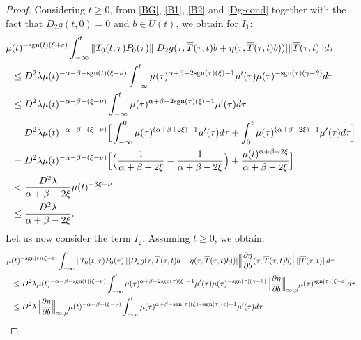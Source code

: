 \documentclass[9pt]{amsart}
\numberwithin{equation}{section}
\numberwithin{lemma}{section}
\begin{document}
\begin{proof}
Considering $t\geq 0$, from \eqref{BG}, \eqref{B1}, \eqref{B2} and \eqref{Dg-cond} together
with the fact that $D_2g(t,0)=0$ and $b\in U(t)$, we obtain for $I_1:$
\begin{equation*}
    \begin{split}
        \mu&(t)^{-\textnormal{sgn}(t)(\xi+\varepsilon)}\int_{-\infty}^{t}\|T_0(t,\tau)P_0(\tau)\| |D_2g(\tau, \overline{T}(\tau,t)b+\eta(\tau,\overline{T}(\tau,t)b))| \|\overline{T}(\tau,t)\|d\tau\\
        &\leq D^2\lambda\mu(t)^{-\alpha-\beta-\textnormal{sgn}(t)(\xi-\nu)}\int_{-\infty}^{t}\mu(\tau)^{\alpha+\beta-2\textnormal{sgn}(\tau)(\xi)-1}\mu'(\tau)\mu(\tau)^{-\textnormal{sgn}(\tau)(\gamma-\theta)}d\tau\\
        &\leq D^2\lambda\mu(t)^{-\alpha-\beta-(\xi-\nu)}\int_{-\infty}^{t}\mu(\tau)^{\alpha+\beta-2\textnormal{sgn}(\tau)(\xi)-1}\mu'(\tau)d\tau\\
        &= D^2\lambda\mu(t)^{-\alpha-\beta-(\xi-\nu)}\Big[\int_{-\infty}^{0}\mu(\tau)^{(\alpha+\beta+2\xi)-1}\mu'(\tau)d\tau+\int_{0}^{t}\mu(\tau)^{(\alpha+\beta-2\xi)-1}\mu'(\tau)d\tau\Big]\\
        &= D^2\lambda\mu(t)^{-\alpha-\beta-(\xi-\nu)}\Big[\Big(\frac{1}{\alpha+\beta+2\xi}-\frac{1}{\alpha+\beta-2\xi}\Big)+\frac{\mu(t)^{\alpha+\beta-2\xi}}{\alpha+\beta-2\xi}\Big]\\
        &< \frac{D^2\lambda}{\alpha+\beta-2\xi}\mu(t)^{-3\xi+\nu}\\
        &\leq \frac{D^2\lambda}{\alpha+\beta-2\xi}.
    \end{split}
    \end{equation*}
    Let us now consider the term \(I_2\). Assuming \(t \geq 0\), we obtain:
\begin{equation*}
    \begin{split}
        \mu&(t)^{-\textnormal{sgn}(t)(\xi+\varepsilon)}\int_{-\infty}^{t}\|T_0(t,\tau)P_0(\tau)\| |D_2g(\tau, \overline{T}(\tau,t)b+\eta(\tau,\overline{T}(\tau,t)b))| \Big\|\frac{\partial\eta}{\partial b}(\tau,\overline{T}(\tau,t)b)\Big\|\|\overline{T}(\tau,t)\|d\tau\\
        &\leq D^2\lambda\mu(t)^{-\alpha-\beta-\textnormal{sgn}(t)(\xi-\nu)}\int_{-\infty}^{t}\mu(\tau)^{\alpha+\beta-2\textnormal{sgn}(\tau)(\xi)-1}\mu'(\tau)\mu(\tau)^{-\textnormal{sgn}(\tau)(\gamma-\theta)}\Big\|\frac{\partial\eta}{\partial b}\Big\|_{\infty,\mu}\mu(\tau)^{\textnormal{sgn}(\tau)(\xi+\varepsilon)}d\tau\\
        &\leq  D^2\lambda\Big\|\frac{\partial\eta}{\partial b}\Big\|_{\infty,\mu}\mu(t)^{-\alpha-\beta-(\xi-\nu)}\int_{-\infty}^{t}\mu(\tau)^{\alpha+\beta-\textnormal{sgn}(\tau)(\xi)+\textnormal{sgn}(\tau)(\varepsilon)-1}\mu'(\tau)d\tau\\

\end{split}
\end{equation*}
\end{proof}
\end{document}
